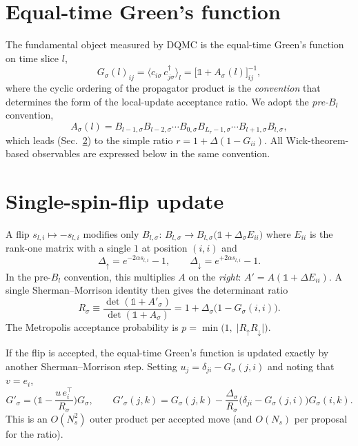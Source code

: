 \documentclass[11pt,a4paper]{article}
\newcommand{\Bm}[2]{B_{#1,#2}}
\newcommand{\Ns}{N_{s}}
\newcommand{\Lt}{L_\tau}
\theoremstyle{plain}
\begin{document}
\section{Equal-time Green's function}

The fundamental object measured by DQMC is the equal-time Green's
function on time slice \(l\),
\begin{equation}
G_\sigma(l)_{ij} = \big\langle c_{i\sigma}\, c^{\dagger}_{j\sigma} \big\rangle_{l}
                 = \big[\mathbb{1} + A_\sigma(l)\big]^{-1}_{ij},
\label{eq:Gdef}
\end{equation}
where the cyclic ordering of the propagator product is the
\emph{convention} that determines the form of the local-update
acceptance ratio. We adopt the \emph{pre-\(B_l\)} convention,
\begin{equation}
A_\sigma(l) =
  \Bm{l-1}{\sigma}\Bm{l-2}{\sigma}\cdots
  \Bm{0}{\sigma}\Bm{\Lt-1}{\sigma}\cdots\Bm{l+1}{\sigma}\Bm{l}{\sigma},
\label{eq:Aconv}
\end{equation}
which leads (Sec.~\ref{sec:update}) to the simple ratio
\(r = 1 + \Delta(1-G_{ii})\). All Wick-theorem-based observables are
expressed below in the same convention.

\section{Single-spin-flip update}\label{sec:update}

A flip \(s_{l,i} \mapsto -s_{l,i}\) modifies only \(\Bm{l}{\sigma}\):
\(\Bm{l}{\sigma}\to \Bm{l}{\sigma}\bigl(\mathbb{1} +
\Delta_\sigma E_{ii}\bigr)\) where \(E_{ii}\) is the rank-one matrix
with a single \(1\) at position \((i,i)\) and
\begin{equation}
\Delta_\uparrow   = e^{-2\alpha s_{l,i}} - 1,
\qquad
\Delta_\downarrow = e^{+2\alpha s_{l,i}} - 1.
\end{equation}
In the pre-\(B_l\) convention, this multiplies \(A\) on the
\emph{right}: \(A' = A(\mathbb{1} + \Delta E_{ii})\). A single Sherman--Morrison
identity then gives the determinant ratio
\begin{equation}
\boxed{\;
R_\sigma \equiv \frac{\det(\mathbb{1} + A'_\sigma)}{\det(\mathbb{1} + A_\sigma)}
       = 1 + \Delta_\sigma\bigl(1 - G_\sigma(i,i)\bigr).
\;}
\label{eq:Rratio}
\end{equation}
The Metropolis acceptance probability is
\(p = \min\!\bigl(1,\; \lvert R_\uparrow R_\downarrow\rvert\bigr)\).

If the flip is accepted, the equal-time Green's function is updated
exactly by another Sherman--Morrison step. Setting
\(u_j = \delta_{ji} - G_\sigma(j,i)\) and noting that
\(v = e_i\),
\begin{equation}
G'_\sigma = \biggl(\mathbb{1} - \frac{u\, e_i^{\!\top}}{R_\sigma}\biggr) G_\sigma,
\qquad
G'_\sigma(j,k) = G_\sigma(j,k)
   - \frac{\Delta_\sigma}{R_\sigma}
     \bigl(\delta_{ji} - G_\sigma(j,i)\bigr) G_\sigma(i,k).
\label{eq:SMupdate}
\end{equation}
This is an \(O(\Ns^2)\) outer product per accepted move (and
\(O(\Ns)\) per proposal for the ratio).
\end{document}
